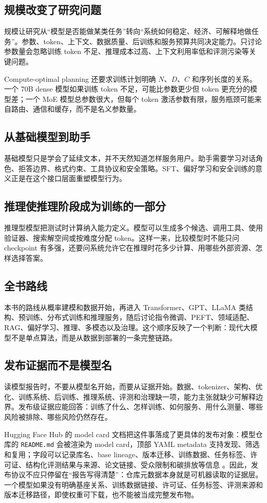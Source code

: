 \documentclass[UTF8,zihao=-4,openany]{ctexbook}
\begin{document}
\subsection{规模改变了研究问题}
规模让研究从“模型是否能做某类任务”转向“系统如何稳定、经济、可解释地做任务”。参数、token、上下文、数据质量、后训练和服务预算共同决定能力。只讨论参数量会忽略训练 token 不足、推理成本过高、上下文利用率低和评测污染等关键问题。

Compute-optimal planning 还要求训练计划明确 $N$、$D$、$C$ 和序列长度的关系。一个 70B dense 模型如果训练 token 不足，可能比参数更少但 token 更充分的模型差；一个 MoE 模型总参数很大，但每个 token 激活参数有限，服务瓶颈可能来自路由、通信和缓存，而不是名义参数量。

\subsection{从基础模型到助手}
基础模型只是学会了延续文本，并不天然知道怎样服务用户。助手需要学习对话角色、拒答边界、格式约束、工具协议和安全策略。SFT、偏好学习和安全训练的意义正是在这个接口层面重塑模型行为。

\subsection{推理使推理阶段成为训练的一部分}
推理型模型把测试时计算纳入能力定义。模型可以生成多个候选、调用工具、使用验证器、搜索解空间或按难度分配 token。这样一来，比较模型时不能只问 checkpoint 有多强，还要问系统允许它在推理时花多少计算、用哪些外部资源、怎样选择答案。

\subsection{全书路线}
本书的路线从概率建模和数据开始，再进入 Transformer、GPT、LLaMA 类结构、预训练、分布式训练和推理服务，随后讨论指令微调、PEFT、领域适配、RAG、偏好学习、推理、多模态以及治理。这个顺序反映了一个判断：现代大模型不是单点算法，而是从数据到部署的一条完整链路。

\subsection{发布证据而不是模型名}
读模型报告时，不要从模型名开始，而要从证据开始。数据、tokenizer、架构、优化、训练系统、后训练、推理系统、评测和治理缺一项，能力主张就缺少可解释边界。发布级证据应能回答：训练了什么、怎样训练、如何服务、用什么测量、哪些风险被排除、哪些风险仍然存在。

Hugging Face Hub 的 model card 文档把这件事落成了更具体的发布对象：模型仓库的 \texttt{README.md} 会被渲染为 model card，顶部 YAML metadata 支持发现、筛选和复用；字段可以记录库名、base lineage、版本迁移、训练数据、任务标签、许可证、结构化评测结果与来源、论文链接、受众限制和碳排放等信息 \cite{huggingface2026hubmodelcards,huggingface2026repocards}。因此，发布协议不应只停留在“报告写得清楚”：仓库元数据本身就是可机器读取的证据层。一个模型如果没有明确基座关系、训练数据链接、许可证、任务标签、评测来源和版本迁移路径，即使权重可下载，也不能被当成完整发布物。
\end{document}
